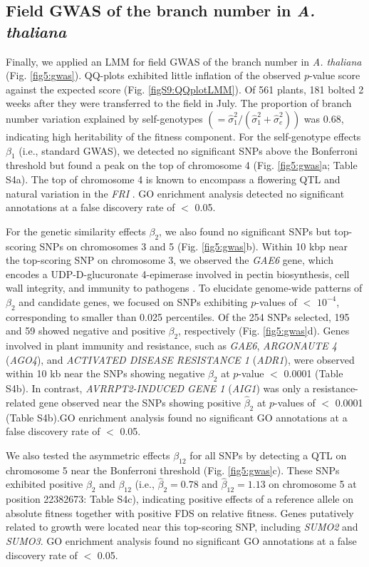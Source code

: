\documentclass[12pt,]{article}
\begin{document}
\subsection{Field GWAS of the branch number in \textit{A. thaliana}}
Finally, we applied an LMM for field GWAS of the branch number in \textit{A. thaliana} (Fig. \ref{fig5:gwas}). QQ-plots exhibited little inflation of the observed $p$-value score against the expected score (Fig. \ref{figS9:QQplotLMM}). Of 561 plants, 181 bolted 2 weeks after they were transferred to the field in July. The proportion of branch number variation explained by self-genotypes $(=\hat{\sigma}^2_1/(\hat{\sigma}^2_1 + \hat{\sigma}^2_e))$ was 0.68, indicating high heritability of the fitness component. For the self-genotype effects $\beta_1$ (i.e., standard GWAS), we detected no significant SNPs above the Bonferroni threshold but found a peak on the top of chromosome 4 (Fig. \ref{fig5:gwas}a; Table S4a). The top of chromosome 4 is known to encompass a flowering QTL and natural variation in the \textit{FRI} \citep{aranzana2005genome}. GO enrichment analysis detected no significant annotations at a false discovery rate of $<$ 0.05. 

For the genetic similarity effects $\beta_2$, we also found no significant SNPs but top-scoring SNPs on chromosomes 3 and 5 (Fig. \ref{fig5:gwas}b). Within 10 kbp near the top-scoring SNP on chromosome 3, we observed the \textit{GAE6} gene, which encodes a UDP-D-glucuronate 4-epimerase involved in pectin biosynthesis, cell wall integrity, and immunity to pathogens \citep{bethke2016pectin}. To elucidate genome-wide patterns of $\beta_2$ and candidate genes, we focused on SNPs exhibiting $p$-values of $<$ $10^{-4}$, corresponding to smaller than 0.025 percentiles. Of the 254 SNPs selected, 195 and 59 showed negative and positive $\beta_2$, respectively (Fig. \ref{fig5:gwas}d). Genes involved in plant immunity and resistance, such as \textit{GAE6}, \textit{ARGONAUTE 4} (\textit{AGO4}), and \textit{ACTIVATED DISEASE RESISTANCE 1} (\textit{ADR1}), were observed within 10 kb near the SNPs showing negative $\beta_2$ at $p$-value $<$ 0.0001 (Table S4b). In contrast, \textit{AVRRPT2-INDUCED GENE 1} (\textit{AIG1}) was only a resistance-related gene observed near the SNPs showing positive $\hat{\beta}_2$ at $p$-values of $<$ 0.0001 (Table S4b).GO enrichment analysis found no significant GO annotations at a false discovery rate of $<$ 0.05.

We also tested the asymmetric effects $\beta_{12}$ for all SNPs by detecting a QTL on chromosome 5 near the Bonferroni threshold (Fig. \ref{fig5:gwas}c). These SNPs exhibited positive $\beta_2$ and $\beta_{12}$ (i.e., $\hat{\beta}_2=0.78$ and $\hat{\beta}_{12}=1.13$ on chromosome 5 at position 22382673: Table S4c), indicating positive effects of a reference allele on absolute fitness together with positive FDS on relative fitness. Genes putatively related to growth were located near this top-scoring SNP, including \textit{SUMO2} and \textit{SUMO3}. GO enrichment analysis found no significant GO annotations at a false discovery rate of $<$ 0.05.
\end{document}
